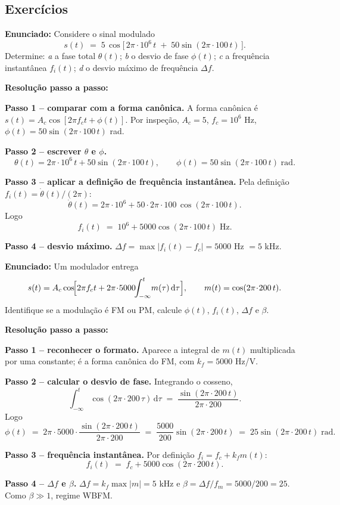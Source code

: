 \documentclass[11pt,a4paper]{article}
\newcommand{\dd}{\,\mathrm{d}}
\begin{document}
\subsection{Exercícios}

\begin{exercicio}
\textbf{Enunciado:} Considere o sinal modulado
\[
  s(t) \;=\; 5\,\cos\!\bigl[\,2\pi\!\cdot\!10^{6}\,t \;+\; 50\sin(2\pi\!\cdot\!100\,t)\,\bigr].
\]
Determine: \emph{a} a fase total $\theta(t)$; \emph{b} o desvio de fase $\phi(t)$; \emph{c} a frequência instantânea $f_i(t)$; \emph{d} o desvio máximo de frequência $\Delta f$.

\textbf{Resolução passo a passo:}

\textbf{Passo 1 -- comparar com a forma canônica.}
A forma canônica é $s(t)=A_c\cos[2\pi f_c t+\phi(t)]$. Por inspeção, $A_c=5$, $f_c=10^{6}$ Hz, $\phi(t)=50\sin(2\pi\!\cdot\!100\,t)$ rad.

\textbf{Passo 2 -- escrever $\theta$ e $\phi$.}
\[
  \theta(t)=2\pi\!\cdot\!10^{6}\,t + 50\sin(2\pi\!\cdot\!100\,t),
  \qquad
  \phi(t)=50\sin(2\pi\!\cdot\!100\,t)\;\text{rad}.
\]

\textbf{Passo 3 -- aplicar a definição de frequência instantânea.}
Pela definição $f_i(t)=\dot\theta(t)/(2\pi)$:
\[
  \dot\theta(t)=2\pi\!\cdot\!10^{6} + 50\cdot 2\pi\!\cdot\!100\,\cos(2\pi\!\cdot\!100\,t).
\]
Logo
\[
  f_i(t) \;=\; 10^{6} + 5000\cos(2\pi\!\cdot\!100\,t)\;\text{Hz}.
\]

\textbf{Passo 4 -- desvio máximo.}
$\Delta f=\max|f_i(t)-f_c|=5000$ Hz $=5$ kHz.
\end{exercicio}

\begin{exercicio}
\textbf{Enunciado:} Um modulador entrega
\[
  s(t)=A_c\cos\!\Bigl[2\pi f_c t + 2\pi\!\cdot\!5000\!\!\int_{-\infty}^{t}\! m(\tau)\dd\tau\Bigr],
  \qquad m(t)=\cos(2\pi\!\cdot\!200\,t).
\]
Identifique se a modulação é FM ou PM, calcule $\phi(t)$, $f_i(t)$, $\Delta f$ e $\beta$.

\textbf{Resolução passo a passo:}

\textbf{Passo 1 -- reconhecer o formato.}
Aparece a integral de $m(t)$ multiplicada por uma constante; é a forma canônica do FM, com $k_f=5000$ Hz/V.

\textbf{Passo 2 -- calcular o desvio de fase.}
Integrando o cosseno,
\[
  \int_{-\infty}^{t}\!\cos(2\pi\!\cdot\!200\,\tau)\dd\tau \;=\; \frac{\sin(2\pi\!\cdot\!200\,t)}{2\pi\!\cdot\!200}.
\]
Logo
\[
  \phi(t) \;=\; 2\pi\!\cdot\!5000\cdot\frac{\sin(2\pi\!\cdot\!200\,t)}{2\pi\!\cdot\!200} \;=\; \frac{5000}{200}\sin(2\pi\!\cdot\!200\,t) \;=\; 25\sin(2\pi\!\cdot\!200\,t)\;\text{rad}.
\]

\textbf{Passo 3 -- frequência instantânea.}
Por definição $f_i=f_c+k_f m(t)$:
\[
  f_i(t) \;=\; f_c + 5000\cos(2\pi\!\cdot\!200\,t).
\]

\textbf{Passo 4 -- $\Delta f$ e $\beta$.}
$\Delta f=k_f\max|m|=5$ kHz e $\beta=\Delta f/f_m=5000/200=25$. Como $\beta\gg 1$, regime WBFM.
\end{exercicio}
\end{document}
